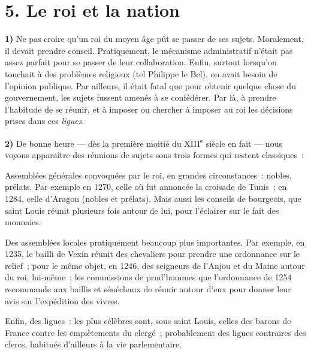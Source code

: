 \documentclass[french,twoside]{book} %
\newcommand{\labelchar}[1]{\textbf{\color{rubric} #1}}
\newcommand\chapteropen{} %
\newcommand\chaptercont{} %
\begin{document}
\chapteropen
\chapter[{5. Le roi et la nation}]{\textsc{5. }Le roi et la nation}
\label{c05}\renewcommand{\leftmark}{\textsc{5. }Le roi et la nation}


\chaptercont
\noindent \labelchar{1)}  
\label{p45} Ne pas croire qu’un roi du moyen âge pût se passer de ses sujets. Moralement, il devait prendre conseil. Pratiquement, le mécanisme administratif n’était pas assez parfait pour se passer de leur collaboration. Enfin, surtout lorsqu’on touchait à des problèmes religieux (tel Philippe le Bel), on avait besoin de l’opinion publique. Par ailleurs, il était fatal que pour obtenir quelque chose du gouvernement, les sujets fussent amenés à se confédérer. Par là, à prendre l’habitude de se réunir, et à imposer ou chercher à imposer au roi les décisions prises dans ces \emph{ligues}.\par
\bigbreak
\noindent \labelchar{2)} De bonne heure — dès la première moitié du XIII\textsuperscript{e} siècle en fait — nous voyons apparaître des réunions de sujets sous trois formes qui restent classiques :\par

\begin{listalpha}[itemsep=0pt,]
\item Assemblées générales convoquées par le roi, en grandes circonstances : nobles, prélats. Par exemple en 1270, celle où fut annoncée la croisade de Tunis ; en 1284, celle d’Aragon (nobles et prélats). Mais aussi les conseils de bourgeois, que saint Louis réunit plusieurs fois autour de lui, pour l’éclairer sur le fait des monnaies.
\item Des assemblées locales pratiquement beaucoup plus importantes. Par exemple, en 1235, le bailli de Vexin réunit des chevaliers pour prendre une ordonnance sur le relief ; pour le même objet, en 1246, des seigneurs de l’Anjou et du Maine autour du roi, lui-même ; les commissions de prud’hommes que l’ordonnance de 1254 recommande aux baillis et sénéchaux de réunir autour d’eux pour donner leur avis sur l’expédition des vivres.
\item Enfin, des ligues : les plus célèbres sont, sous saint Louis, celles des barons de France contre les empiètements du clergé ; probablement des ligues contraires des clercs, habitués d’ailleurs à la vie parlementaire.
\end{listalpha}
\end{document}
